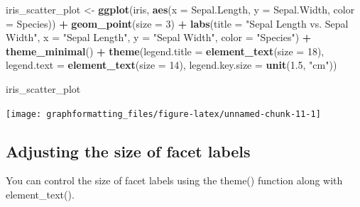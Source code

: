 \documentclass[
]{book}
\newenvironment{Shaded}{\begin{snugshade}}{\end{snugshade}}
\newcommand{\AttributeTok}[1]{\textcolor[rgb]{0.13,0.29,0.53}{#1}}
\newcommand{\DecValTok}[1]{\textcolor[rgb]{0.00,0.00,0.81}{#1}}
\newcommand{\FloatTok}[1]{\textcolor[rgb]{0.00,0.00,0.81}{#1}}
\newcommand{\FunctionTok}[1]{\textcolor[rgb]{0.13,0.29,0.53}{\textbf{#1}}}
\newcommand{\NormalTok}[1]{#1}
\newcommand{\OtherTok}[1]{\textcolor[rgb]{0.56,0.35,0.01}{#1}}
\newcommand{\SpecialCharTok}[1]{\textcolor[rgb]{0.81,0.36,0.00}{\textbf{#1}}}
\newcommand{\StringTok}[1]{\textcolor[rgb]{0.31,0.60,0.02}{#1}}
\begin{document}
\begin{Shaded}
\begin{Highlighting}[]
\NormalTok{iris\_scatter\_plot }\OtherTok{\textless{}{-}} \FunctionTok{ggplot}\NormalTok{(iris, }\FunctionTok{aes}\NormalTok{(}\AttributeTok{x =}\NormalTok{ Sepal.Length, }\AttributeTok{y =}\NormalTok{ Sepal.Width, }\AttributeTok{color =}\NormalTok{ Species)) }\SpecialCharTok{+}
  \FunctionTok{geom\_point}\NormalTok{(}\AttributeTok{size =} \DecValTok{3}\NormalTok{) }\SpecialCharTok{+}
  \FunctionTok{labs}\NormalTok{(}\AttributeTok{title =} \StringTok{"Sepal Length vs. Sepal Width"}\NormalTok{,}
       \AttributeTok{x =} \StringTok{"Sepal Length"}\NormalTok{,}
       \AttributeTok{y =} \StringTok{"Sepal Width"}\NormalTok{,}
       \AttributeTok{color =} \StringTok{"Species"}\NormalTok{) }\SpecialCharTok{+}
  \FunctionTok{theme\_minimal}\NormalTok{() }\SpecialCharTok{+}
  \FunctionTok{theme}\NormalTok{(}\AttributeTok{legend.title =} \FunctionTok{element\_text}\NormalTok{(}\AttributeTok{size =} \DecValTok{18}\NormalTok{),}
        \AttributeTok{legend.text =} \FunctionTok{element\_text}\NormalTok{(}\AttributeTok{size =} \DecValTok{14}\NormalTok{),}
        \AttributeTok{legend.key.size =} \FunctionTok{unit}\NormalTok{(}\FloatTok{1.5}\NormalTok{, }\StringTok{"cm"}\NormalTok{))}

\NormalTok{iris\_scatter\_plot}
\end{Highlighting}
\end{Shaded}

\texttt{[image: graphformatting\_files/figure-latex/unnamed-chunk-11-1]}

\hypertarget{adjusting-the-size-of-facet-labels}{%
\subsection{Adjusting the size of facet labels}\label{adjusting-the-size-of-facet-labels}}

You can control the size of facet labels using the theme() function along with element\_text().
\end{document}
